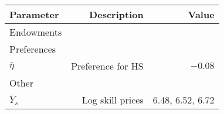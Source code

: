 \begin{tabular}{lrr}
\hline
Parameter & Description  & Value  \\ 
\hline
Endowments &   &   \\ 
Preferences &   &   \\ 
$\bar{\eta}$ & Preference for HS  & $-0.08$  \\ 
Other &   &   \\ 
$\bar{Y}_{s}$ & Log skill prices  & 6.48, 6.52, 6.72  \\ 
\hline
\end{tabular}%
